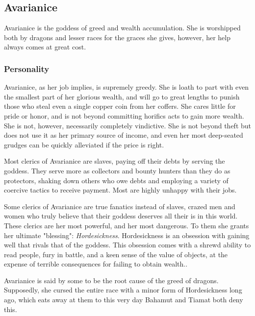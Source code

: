\subsection*{Avarianice}
\begin{goddesc}
\end{goddesc}
Avarianice is the goddess of greed and wealth accumulation.
She is worshipped both by dragons and lesser races for the graces she gives, however, her help always comes at great cost.

\subsubsection*{Personality}
Avarianice, as her job implies, is supremely greedy.
She is loath to part with even the smallest part of her glorious wealth, and will go to great lengths to punish those who steal even a single copper coin from her coffers.
She cares little for pride or honor, and is not beyond committing horifics acts to gain more wealth.
She is not, however, necessarily completely vindictive.
She is not beyond theft but does not use it as her primary source of income, and even her most deep-seated grudges can be quickly alleviated if the price is right.

Most clerics of Avarianice are slaves, paying off their debts by serving the goddess.
They serve more as collectors and bounty hunters than they do as protectors, shaking down others who owe debts and employing a variety of coercive tactics to receive payment.
Most are highly unhappy with their jobs.

Some clerics of Avarianice are true fanatics instead of slaves, crazed men and women who truly believe that their goddess deserves all their is in this world.
These clerics are her most powerful, and her most dangerous.
To them she grants her ultimate "blessing": \textit{Hordesickness}.
Hordesickness is an obsession with gaining well that rivals that of the goddess.
This obsession comes with a shrewd ability to read people, fury in battle, and a keen sense of the value of objects, at the expense of terrible consequences for failing to obtain wealth..

Avarianice is said by some to be the root cause of the greed of dragons.
Supposedly, she cursed the entire race with a minor form of Hordesickness long ago, which eats away at them to this very day
Bahamut and Tiamat both deny this.

